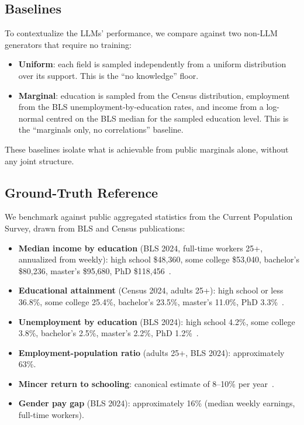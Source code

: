 \documentclass[11pt]{article}
\begin{document}
\subsection{Baselines}

To contextualize the LLMs' performance, we compare against two non-LLM generators that require no training:
\begin{itemize}[leftmargin=*, itemsep=1pt]
  \item \textbf{Uniform}: each field is sampled independently from a uniform distribution over its support. This is the ``no knowledge'' floor.
  \item \textbf{Marginal}: education is sampled from the Census distribution, employment from the BLS unemployment-by-education rates, and income from a log-normal centred on the BLS median for the sampled education level. This is the ``marginals only, no correlations'' baseline.
\end{itemize}
These baselines isolate what is achievable from public marginals alone, without any joint structure.

\subsection{Ground-Truth Reference}

We benchmark against public aggregated statistics from the Current Population Survey, drawn from BLS and Census publications:
\begin{itemize}[leftmargin=*, itemsep=1pt]
  \item \textbf{Median income by education} (BLS 2024, full-time workers 25+, annualized from weekly): high school \$48{,}360, some college \$53{,}040, bachelor's \$80{,}236, master's \$95{,}680, PhD \$118{,}456~\cite{bls2024earnings}.
  \item \textbf{Educational attainment} (Census 2024, adults 25+): high school or less 36.8\%, some college 25.4\%, bachelor's 23.5\%, master's 11.0\%, PhD 3.3\%~\cite{census2024attainment,census2024tables}.
  \item \textbf{Unemployment by education} (BLS 2024): high school 4.2\%, some college 3.8\%, bachelor's 2.5\%, master's 2.2\%, PhD 1.2\%~\cite{bls2024unemployment}.
  \item \textbf{Employment-population ratio} (adults 25+, BLS 2024): approximately 63\%.
  \item \textbf{Mincer return to schooling}: canonical estimate of 8--10\% per year~\cite{mincer1974schooling,card1999causal,angrist1991does}.
  \item \textbf{Gender pay gap} (BLS 2024): approximately 16\% (median weekly earnings, full-time workers).
\end{itemize}
\end{document}
